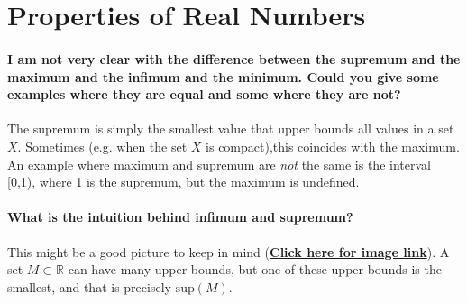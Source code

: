 \documentclass[10pt,english]{article}
\begin{document}
\iffalse

\paragraph{Dawei Xi: Why do we define three different continuous functions, continuous function, uniformly continuous, Lipschitz continuous?}



\paragraph{Why is for standard metric space (e.g. used in real analysis), $X = \mathbb{R}$, and for Euclidean space $X = \mathbb{R}^n$?}




\fi

\section{Properties of Real Numbers}

\paragraph{I am not very clear with the difference between the supremum and the maximum and the infimum and the minimum. Could you give some examples where they are equal and some where they are not?}
The supremum is simply the smallest value that upper bounds all values in a set $X$. Sometimes (e.g. when the set $X$ is compact),this coincides with the maximum. An example where maximum and supremum are \textit{not} the same is the interval [0,1), where 1 is the supremum, but the maximum is undefined.

\paragraph{What is the intuition behind infimum and supremum?}

This might be a good picture to keep in mind (\href{https://en.wikipedia.org/wiki/Infimum_and_supremum#/media/File:Illustration_of_supremum.svg}{\textbf{Click here for image link}}). A set $M\subset \mathbb{R}$ can have many upper bounds, but one of these upper bounds is the smallest, and that is precisely $\text{sup}(M)$.
\end{document}
